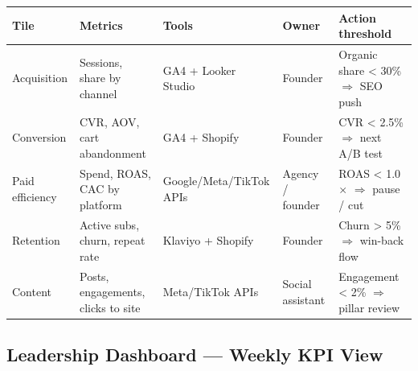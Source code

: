 \documentclass[
  11pt,
]{article}
\begin{document}
\begin{longtable}[]{@{}
  >{\raggedright\arraybackslash}p{}
  >{\raggedright\arraybackslash}p{}
  >{\raggedright\arraybackslash}p{}
  >{\raggedright\arraybackslash}p{}
  >{\raggedright\arraybackslash}p{}@{}}
\toprule\noalign{}
\begin{minipage}[b]{\linewidth}\raggedright
Tile
\end{minipage} & \begin{minipage}[b]{\linewidth}\raggedright
Metrics
\end{minipage} & \begin{minipage}[b]{\linewidth}\raggedright
Tools
\end{minipage} & \begin{minipage}[b]{\linewidth}\raggedright
Owner
\end{minipage} & \begin{minipage}[b]{\linewidth}\raggedright
Action threshold
\end{minipage} \\
\midrule\noalign{}
\endhead
\bottomrule\noalign{}
\endlastfoot
Acquisition & Sessions, share by channel & GA4 + Looker Studio & Founder
& Organic share \textless{} 30\% \(\Rightarrow\) SEO push \\
Conversion & CVR, AOV, cart abandonment & GA4 + Shopify & Founder & CVR
\textless{} 2.5\% \(\Rightarrow\) next A/B test \\
Paid efficiency & Spend, ROAS, CAC by platform & Google/Meta/TikTok APIs
& Agency / founder & ROAS \textless{} 1.0\(\times\) \(\Rightarrow\)
pause / cut \\
Retention & Active subs, churn, repeat rate & Klaviyo + Shopify &
Founder & Churn \textgreater{} 5\% \(\Rightarrow\) win-back flow \\
Content & Posts, engagements, clicks to site & Meta/TikTok APIs & Social
assistant & Engagement \textless{} 2\% \(\Rightarrow\) pillar review \\
\end{longtable}

\subsection{Leadership Dashboard --- Weekly KPI
View}\label{leadership-dashboard-weekly-kpi-view}
\end{document}
